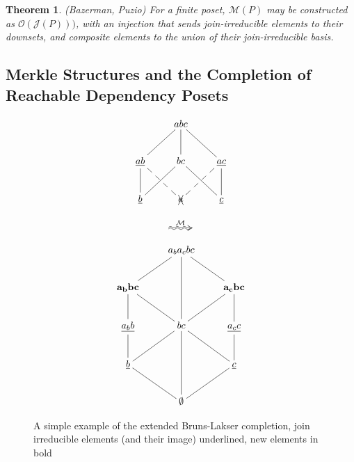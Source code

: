 \documentclass[hoptionsi,review,format=acmsmall]{acmart}
\newtheorem{theorem}{Theorem}[section]
\theoremstyle{definition}
\newcommand{\Mcc}{\mathcal{M}}
\newcommand{\Oc}{\mathcal{O}}
\newcommand{\Jc}{\mathcal{J}}
\begin{document}
\begin{theorem}
(Bazerman, Puzio) For a finite poset, \(\Mcc(P)\) may be constructed as \(\Oc(\Jc(P)))\), with an injection that sends join-irreducible elements to their downsets, and composite elements to the union of their join-irreducible basis.
\end{theorem}

\subsection{Merkle Structures and the Completion of Reachable Dependency Posets}


\begin{figure}
\begin{minipage}[c]{0.3\textwidth}
\begin{equation*}
    \xymatrix{& abc \ar@{-}[dl] \ar@{-}[d] \ar@{-}[dr] & \\
      \underline{ab} \ar@{-}[d] \ar@{--}[dr] & bc \ar@{-}[dl] \ar@{-}[dr] &
        \underline{ac} \ar@{-}[d] \ar@{--}[dl] \\
        \underline{b} & \xcancel{a}  & \underline{c} }         
\end{equation*}
\end{minipage}
\begin{minipage}[c]{0.08\textwidth}
  \begin{equation*}
    \xymatrix{\ar@2{~>}[r]^{\Mcc} &}
  \end{equation*}
\end{minipage}
\begin{minipage}[c]{0.3\textwidth}
\begin{equation*}
    \xymatrix{& a_ba_cbc \ar@{-}[dl] \ar@{-}[dd] \ar@{-}[dr] & \\
      \mathbf{a_bbc} \ar@{-}[d] \ar@{-}[dr] & &
        \mathbf{a_cbc} \ar@{-}[d] \ar@{-}[dl]\\
        \underline{a_bb} \ar@{-}[d] & bc \ar@{-}[dl] \ar@{-}[dd] \ar@{-}[dr] &
          \underline{a_cc} \ar@{-}[d] \\
         \underline{b} \ar@{-}[dr] & & \underline{c} \ar@{-}[dl] \\
      & \mathbf{\emptyset} }
\end{equation*}
\end{minipage}
\caption{A simple example of the extended Bruns-Lakser completion, join irreducible elements (and their image) underlined, new elements in bold}
\label{Fig1}
\end{figure}
\end{document}
